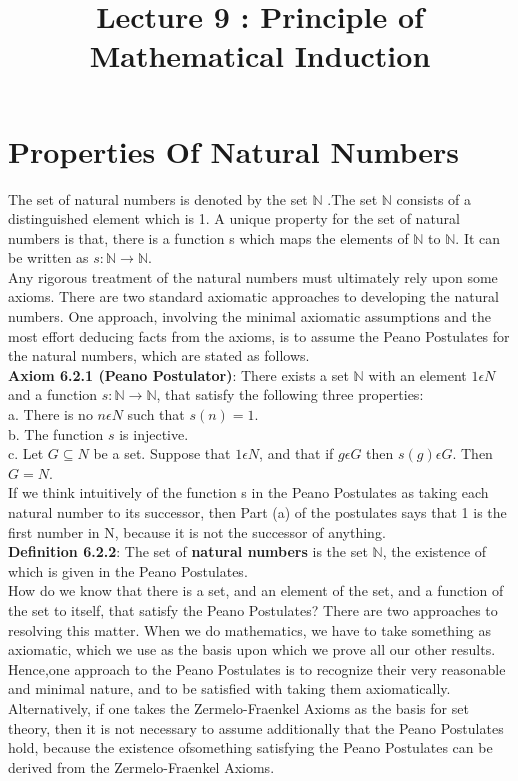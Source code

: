 \documentclass[a4paper,english,12pt]{article}
\title{\bf Lecture 9	: Principle of Mathematical Induction}
\author{}
\begin{document}
\maketitle
\section{Properties Of Natural Numbers}
The set of natural numbers is denoted by the set $\mathbb{N}$ .The set $\mathbb{N}$ consists of a distinguished element which is  1. A unique property for the set of natural numbers is that, there is a function s which maps the elements of $\mathbb{N}$ to $\mathbb{N}$. It can be written as $s:\mathbb{N}\rightarrow \mathbb{N}$.\\
Any rigorous treatment of the natural numbers must ultimately rely upon some
axioms. There are two standard axiomatic approaches to developing the natural numbers. One approach, involving the minimal axiomatic assumptions and the most effort deducing facts from the axioms, is to assume the Peano Postulates for the natural numbers, which are stated as follows.\\

{\bf Axiom 6.2.1 (Peano Postulator)}: There exists a set $\mathbb{N}$ with an element $1\epsilon N$ and a function $s:\mathbb{N}\rightarrow \mathbb{N}$, that satisfy the following three properties:\\
a. There is no $n\epsilon N$ such that $s(n)=1$.\\
b. The function $s$ is injective.\\
c. Let $G \subseteq N$ be a set. Suppose that $1 \epsilon N$, and that if $g\epsilon G$ then $s(g) \epsilon G$. Then $G=N$.\\

If we think intuitively of the function s in the Peano Postulates as taking each
natural number to its successor, then Part (a) of the postulates says that 1 is the first number in N, because it is not the successor of anything.\\

{\bf Definition 6.2.2}: The set of {\bf natural numbers} is the set $\mathbb{N}$, the existence of which is given in the Peano Postulates.\\

How do we know that there is a set, and an element of the set, and a function
of the set to itself, that satisfy the Peano Postulates? There are two approaches to resolving this matter. When we do mathematics, we have to take something as axiomatic, which we use as the basis upon which we prove all our other results. Hence,one approach to the Peano Postulates is to recognize their very reasonable and minimal nature, and to be satisfied with taking them axiomatically. Alternatively, if one takes the Zermelo-Fraenkel Axioms as the basis for set theory, then it is not necessary to assume additionally that the Peano Postulates hold, because the existence ofsomething satisfying the Peano Postulates can be derived from the Zermelo-Fraenkel Axioms.\\
\end{document}
